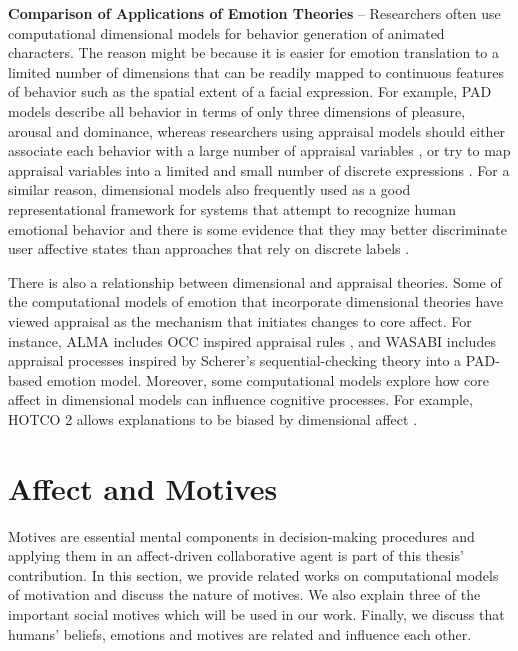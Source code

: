 \documentclass[12pt]{report}
\begin{document}
\textbf{Comparison of Applications of Emotion Theories} -- Researchers often use
computational dimensional models for behavior generation of animated characters.
The reason might be because it is easier for emotion translation to a limited
number of dimensions that can be readily mapped to continuous features of
behavior such as the spatial extent of a facial expression. For example, PAD
models describe all behavior in terms of only three dimensions of pleasure,
arousal and dominance, whereas researchers using appraisal models should either
associate each behavior with a large number of appraisal variables
\cite{scherer:expression-appraisal}
\cite{smith:computational-facial-expression}, or try to map appraisal variables
into a limited and small number of discrete expressions
\cite{elliott:affective-reasoner}. For a similar reason, dimensional models also
frequently used as a good representational framework for systems that attempt to
recognize human emotional behavior and there is some evidence that they may
better discriminate user affective states than approaches that rely on discrete
labels \cite{barrett:emotions-natural}.

There is also a relationship between dimensional and appraisal theories. Some of
the computational models of emotion that incorporate dimensional theories have
viewed appraisal as the mechanism that initiates changes to core affect. For
instance, ALMA \cite{gebhard:alma} includes OCC inspired appraisal rules
\cite{occ:structure}, and WASABI \cite{becker:wasabi} includes appraisal
processes inspired by Scherer's sequential-checking theory into a PAD-based
emotion model. Moreover, some computational models explore how core affect in
dimensional models can influence cognitive processes. For example, HOTCO 2
\cite{thagard:emotional-coherence} allows explanations to be biased by
dimensional affect \cite{marsella:computational-models}.

\section{Affect and Motives}

Motives are essential mental components in decision-making procedures and
applying them in an affect-driven collaborative agent is part of this thesis'
contribution. In this section, we provide related works on computational models
of motivation and discuss the nature of motives. We also explain three of the
important social motives which will be used in our work. Finally, we discuss that
humans' beliefs, emotions and motives are related and influence each other. 
\end{document}
